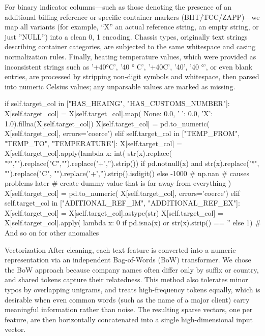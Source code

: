 For binary indicator columns—such as those denoting the presence of an additional billing reference or specific container markers (BHT/TCC/ZAPP)—we map all variants (for example, “X” an actual reference string, an empty string, or just ''NULL'') into a clean {0, 1} encoding. Chassis types, originally text strings describing container categories, are subjected to the same whitespace and casing normalization rules. Finally, heating temperature values, which were provided as inconsistent strings such as '+40°C', '40 ° C', '+40C', '40', '40 °', or even blank entries, are processed by stripping non-digit symbols and whitespace, then parsed into numeric Celsius values; any unparsable values are marked as missing.

\begtt {}
if self.target_col in ["HAS_HEAING", "HAS_CUSTOMS_NUMBER"]:
    X[self.target_col] = X[self.target_col].map(
        {None: 0.0, ' ': 0.0, 'X': 1.0}).fillna(X[self.target_col])
    X[self.target_col] = pd.to_numeric(
        X[self.target_col], errors='coerce')
elif self.target_col in ["TEMP_FROM", "TEMP_TO", "TEMPERATURE"]:
    X[self.target_col] = X[self.target_col].apply(lambda x: int(
    str(x).replace(
    "°","").replace("C","").replace('+','').strip()) 
            if pd.notnull(x) and str(x).replace("°", "").replace("C",
            "").replace('+','').strip().isdigit() 
            else -1000 # np.nan # causes problems later
            # create dummy value that is far away from everything
            )
    X[self.target_col] = pd.to_numeric(
        X[self.target_col], errors='coerce')
elif self.target_col in ["ADITIONAL_REF_IM", "ADDITIONAL_REF_EX"]:
    X[self.target_col] = X[self.target_col].astype(str)
    X[self.target_col] = X[self.target_col].apply(
        lambda x: 0 if pd.isna(x) or str(x).strip() == '' else 1)
# And so on for other anomalies
\endtt

\secc Vectorization
After cleaning, each text feature is converted into a numeric representation via an independent Bag-of-Words (BoW) transformer. We chose the BoW approach because company names often differ only by suffix or country, and shared tokens capture their relatedness. This method also tolerates minor typos by overlapping unigrams, and treats high-frequency tokens equally, which is desirable when even common words (such as the name of a major client) carry meaningful information rather than noise.  The resulting sparse vectors, one per feature, are then horizontally concatenated into a single high-dimensional input vector.

